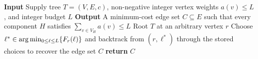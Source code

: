 \begin{algorithm}[tbp]
    \caption{Weighted-budget dynamic program on a tree}
    \textbf{Input} Supply tree $T=(V,E,c)$, non-negative integer vertex weights $a(v)\leq L$, and integer budget $L$\;
    \textbf{Output} A minimum-cost edge set $C\subseteq E$ such that every component $H$ satisfies $\sum_{v\in V_H}a(v)\leq L$\;
    Root $T$ at an arbitrary vertex $r$\;
    Choose $\ell^*\in\arg\min_{0\leq\ell\leq L}\mathopen{}\left\{ F_r(\ell) \right\}$ and backtrack from $(r,\ell^*)$ through the stored choices to recover the edge set $C$\;
    \textbf{return} $C$\;
\end{algorithm}
